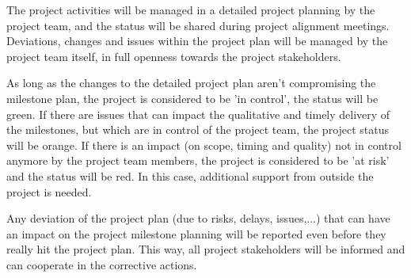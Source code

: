The project activities will be managed in a detailed project planning by the project team, and the status will be shared during project alignment meetings.
Deviations, changes and issues within the project plan will be managed by the project team itself, in full openness towards the project stakeholders. 

As long as the changes to the detailed project plan aren't  compromising the milestone plan, the project is considered to be 'in control', the status will be green.  If there are issues that can impact the qualitative and timely delivery of the milestones, but which are in control of the project team, the project status will be orange. If there is an impact (on scope, timing and quality) not in control anymore by the project team members, the project is considered to be 'at risk' and the status will be red. In this case, additional support from outside the project is needed.

Any deviation of the project plan (due to risks, delays, issues,...) that can have an impact on the project milestone planning will be reported even before they really hit the project plan. 
This way, all project stakeholders will be informed and can cooperate in the corrective actions.




